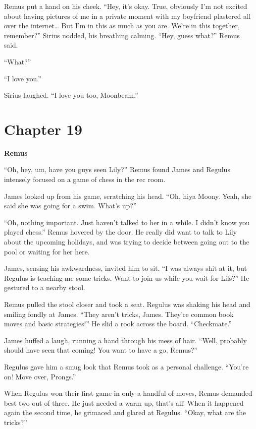 \documentclass[12pt,twoside,openright]{memoir}
\begin{document}
Remus put a hand on his cheek. ``Hey, it's okay. True, obviously I'm not excited about having pictures of me in a private moment with my boyfriend plastered all over the internet… But I'm in this as much as you are. We're in this together, remember?'' Sirius nodded, his breathing calming. ``Hey, guess what?'' Remus said.

``What?''

``I love you.'' 

Sirius laughed. ``I love you too, Moonbeam.''

\chapter*{Chapter 19}

\textbf{Remus} 

``Oh, hey, um, have you guys seen Lily?'' Remus found James and Regulus intensely focused on a game of chess in the rec room. 

James looked up from his game, scratching his head. ``Oh, hiya Moony. Yeah, she said she was going for a swim. What's up?''

``Oh, nothing important. Just haven't talked to her in a while. I didn't know you played chess.'' Remus hovered by the door. He really did want to talk to Lily about the upcoming holidays, and was trying to decide between going out to the pool or waiting for her here. 

James, sensing his awkwardness, invited him to sit. ``I was always shit at it, but Regulus is teaching me some tricks. Want to join us while you wait for Lils?'' He gestured to a nearby stool. 

Remus pulled the stool closer and took a seat. Regulus was shaking his head and smiling fondly at James. ``They aren't tricks, James. They're common book moves and basic strategies!'' He slid a rook across the board. ``Checkmate.''

James huffed a laugh, running a hand through his mess of hair. ``Well, probably should have seen that coming! You want to have a go, Remus?''

Regulus gave him a smug look that Remus took as a personal challenge. ``You're on! Move over, Prongs.''

When Regulus won their first game in only a handful of moves, Remus demanded best two out of three. He just needed a warm up, that's all! When it happened again the second time, he grimaced and glared at Regulus. ``Okay, what are the tricks?''
\end{document}
